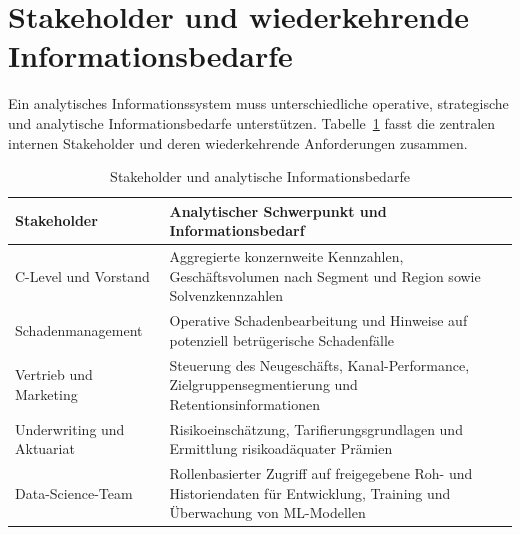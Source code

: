 \section{Stakeholder und wiederkehrende Informationsbedarfe}
\label{sec:stakeholder}

Ein analytisches Informationssystem muss unterschiedliche operative,
strategische und analytische Informationsbedarfe unterstützen.
Tabelle~\ref{tab:stakeholder} fasst die zentralen internen Stakeholder und
deren wiederkehrende Anforderungen zusammen.

\begin{table}[H]
  \centering
  \caption{Stakeholder und analytische Informationsbedarfe}
  \label{tab:stakeholder}
  \begin{tabularx}{\textwidth}{@{}p{4.5cm}X@{}}
    \toprule
    Stakeholder & Analytischer Schwerpunkt und Informationsbedarf \\
    \midrule
    C-Level und Vorstand
      & Aggregierte konzernweite Kennzahlen, Geschäftsvolumen nach Segment und
        Region sowie Solvenzkennzahlen \\
    Schadenmanagement
      & Operative Schadenbearbeitung und Hinweise auf potenziell
        betrügerische Schadenfälle \\
    Vertrieb und Marketing
      & Steuerung des Neugeschäfts, Kanal-Performance,
        Zielgruppensegmentierung und Retentionsinformationen \\
    Underwriting und Aktuariat
      & Risikoeinschätzung, Tarifierungsgrundlagen und Ermittlung
        risikoadäquater Prämien \\
    Data-Science-Team
      & Rollenbasierter Zugriff auf freigegebene Roh- und Historiendaten für
        Entwicklung, Training und Überwachung von ML-Modellen \\
    \bottomrule
  \end{tabularx}
\end{table}
